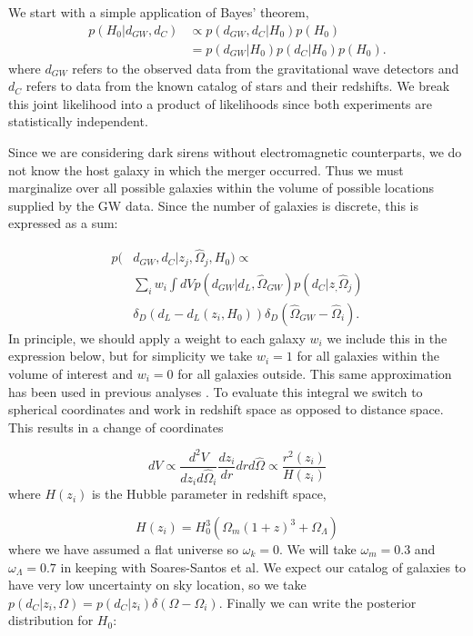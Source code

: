 We start with a simple application of Bayes' theorem,
\begin{align}
    p(H_0|d_{GW}, d_C)&\propto p(d_{GW}, d_C|H_0)p(H_0)\nonumber\\
    &= p(d_{GW}|H_0)p(d_C|H_0)p(H_0).
\label{eq:bayes}
\end{align}
where $d_{GW}$ refers to the observed data from the gravitational wave detectors and $d_C$ refers to data from the known catalog of stars and their redshifts. We break this joint likelihood into a product of likelihoods since both experiments are statistically independent.

Since we are considering dark sirens without electromagnetic counterparts, we do not know the host galaxy in which the merger occurred. Thus we must marginalize over all possible galaxies within the volume of possible locations supplied by the GW data. Since the number of galaxies is discrete, this is expressed as a sum:

\begin{align}
    p(&d_{GW}, d_C|{z_j, \hat{\Omega}_j},H_0)  \propto  \nonumber\\
    &\sum_{i} w_i \int dV p(d_{GW}|d_L, \hat{\Omega}_{GW}) 
    p(d_C|{z_, \hat{\Omega}_j}) \nonumber\\
    & \delta_D (d_L - d_L(z_i, H_0)) \delta_D (\hat{\Omega}_{GW} - \hat{\Omega}_i).
    \label{eq:marginal_like}
\end{align}
In principle, we should apply a weight to each galaxy $w_i$ we include this in the expression below, but for simplicity we take $w_i=1$ for all galaxies within the volume of interest and $w_i=0$ for all galaxies outside. This same approximation has been used in previous analyses \cite{Chen_2018,GW170814_DES,Nair_2018}. To evaluate this integral we switch to spherical coordinates and work in redshift space as opposed to distance space. This results in a change of coordinates

\begin{equation}
dV \propto \frac{d^2 V}{d z_i d\hat{\Omega}_i} \frac{d z_i}{d r} d r d\hat{\Omega} \propto \frac{r^2(z_i)}{H(z_i)}
\end{equation}
where $H(z_i)$ is the Hubble parameter in redshift space,

\begin{equation}
H(z_i) = H_0^3 \left(\Omega_m (1+z)^3 + \Omega_\Lambda\right)
\end{equation}
where we have assumed a flat universe so $\omega_k = 0$. We will take $\omega_m = 0.3$ and $\omega_\Lambda = 0.7$ in keeping with Soares-Santos et al. We expect our catalog of galaxies to have very low uncertainty on sky location, so we take $p(d_C|z_i,\Omega)=p(d_C|z_i)\delta(\Omega - \Omega_i)$. Finally we can write the posterior distribution for $H_0$:

